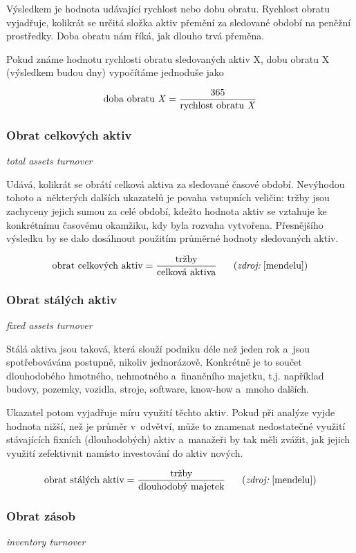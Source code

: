 Výsledkem je hodnota udávající rychlost nebo dobu obratu. Rychlost obratu vyjadřuje, kolikrát se určitá složka aktiv přemění za sledované období na peněžní prostředky. Doba obratu nám říká, jak dlouho trvá přeměna.

Pokud známe hodnotu rychlosti obratu sledovaných aktiv X, dobu obratu X (výsledkem budou dny) vypočítáme jednoduše jako 

$$\text{doba obratu \textit{X}} = \dfrac{\text{365}}{\text{rychlost obratu \textit{X}}}$$


\subsubsection{Obrat celkových aktiv}
\textit{total assets turnover}

Udává, kolikrát se obrátí celková aktiva za sledované časové období. Nevýhodou tohoto a~některých dalších ukazatelů je povaha vstupních veličin: tržby jsou zachyceny jejich sumou za celé období, kdežto hodnota aktiv se vztahuje ke konkrétnímu časovému okamžiku, kdy byla rozvaha vytvořena. Přesnějšího výsledku by se dalo dosáhnout použitím průměrné hodnoty sledovaných aktiv. 

$$\vz{obrat celkových aktiv}{tržby}{celková aktiva} \scite{mendelu}$$

\subsubsection{Obrat stálých aktiv}
\textit{fixed assets turnover}

Stálá aktiva jsou taková, která slouží podniku déle než jeden rok a~jsou spotřebovávána postupně, nikoliv jednorázově. Konkrétně je to součet dlouhodobého hmotného, nehmotného a~finančního majetku, t.j. například budovy, pozemky, vozidla, stroje, software, know-how a~mnoho dalších.

Ukazatel potom vyjadřuje míru využití těchto aktiv. Pokud při analýze vyjde hodnota nižší, než je průměr v~odvětví, může to znamenat nedostatečné využití stávajících fixních (dlouhodobých) aktiv a~manažeři by tak měli zvážit, jak jejich využití zefektivnit namísto investování do aktiv nových.

$$\vz{obrat stálých aktiv}{tržby}{dlouhodobý majetek} \scite{mendelu}$$

\subsubsection{Obrat zásob}
\textit{inventory turnover}

